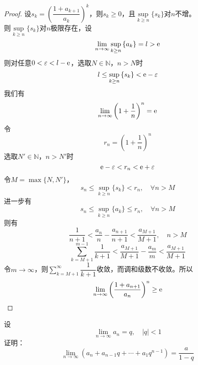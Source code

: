 \begin{proof}

    设$s_k = \left( \dfrac{1+a_{k+1}}{a_k} \right)^k$，则$s_k \geq 0$，且$\sup\limits_{k\geq n}\{s_k\}$对$n$不增。\\
    则$\sup\limits_{k\geq n}\{s_k\}$对$n$极限存在，设
    $$\lim\limits_{n\to\infty}{\sup_{k\geq n}{\{a_k\}}} = l >\mathrm{e}$$
    则对任意$0 < \varepsilon < l - \mathrm{e}$，选取$N \in \mathbb{N}$，$n > N$时
    $$l \leq \sup_{k\geq n }{\{s_k\}} < \mathrm{e} - \varepsilon$$
    我们有
    $$\lim\limits_{n\to\infty}{\left( 1 + \dfrac{1}{n}\right)^n} = \mathrm{e}$$
    令
    $$r_n = \left(1 + \dfrac{1}{n}\right)^n$$
    选取$N' \in \mathbb{N}$，$n > N'$时
    $$\mathrm{e} - \varepsilon < r_n < \mathrm{e} + \varepsilon$$
    令$M = \max\{N,N'\}$，
    $$s_n \leq \sup_{k\geq n}\{s_k\} < r_n, \quad \forall n > M$$
    进一步有
    $$s_n \leq \sup_{k\geq n}\{a_k\} \leq r_n,\quad \forall n > M$$
    则有
    $$\dfrac{1}{n + 1} < \dfrac{a_n}{n} - \dfrac{a_{n+1}}{n+1} < \dfrac{a_{M + 1}}{M + 1}, \quad n > M$$
    $$\sum\limits_{k = M + 1}^{m-1}{\dfrac{1}{k+1}} < \dfrac{a_{M + 1}}{M + 1} - \dfrac{a_m}{m} < \dfrac{a_{M + 1}}{M + 1}$$
    令$m \to \infty$，则$\sum\limits_{k = M + 1}^{\infty}{\dfrac{1}{k + 1}}$收敛，而调和级数不收敛。所以
    $$\lim\limits_{n\to\infty}{\left( \dfrac{1 + a_{n + 1}}{a_n} \right)^n} \geq \mathrm{e}$$

\end{proof}

\begin{proposition}
    
    设
    $$\lim\limits_{n\to\infty}{a_n} = q, \quad |q| < 1$$
    证明：
    $$\lim\limits_{n\to\infty}{(a_n + a_{n-1}q + \cdots + a_1q^{n-1})} = \dfrac{a}{1 - q}$$

\end{proposition}

